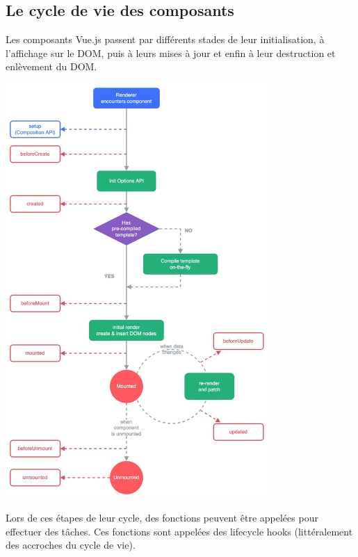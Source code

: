 \subsection{Le cycle de vie des composants}
Les composants {\color{monOrange}Vue.js} passent par différents stades de leur initialisation, à l'affichage sur le DOM, puis à leurs mises à jour et enfin à leur destruction et enlèvement du DOM.
\begin{center}
\includegraphics[width=10cm]{images/image09.png}
\end{center}

Lors de ces étapes de leur cycle, des fonctions peuvent être appelées pour effectuer des tâches. Ces fonctions sont appelées des {\color{monOrange}lifecycle hooks} (littéralement des accroches du cycle de vie).

